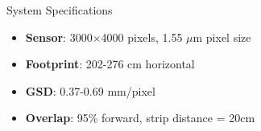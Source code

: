 \documentclass[aspectratio=43]{beamer}
\begin{document}
\begin{frame}
\begin{columns}
\begin{column}{0.5\textwidth}
            \begin{exampleblock}{System Specifications}
                \scriptsize
                \begin{itemize}
                    \item \textbf{Sensor}: 3000\ensuremath{\times}4000 pixels, 1.55 \ensuremath{\mu}m pixel size
                    \item \textbf{Footprint}: 202-276 cm horizontal
                    \item \textbf{GSD}: 0.37-0.69 mm/pixel
                    \item \textbf{Overlap}: 95\% forward, strip distance = 20cm
                \end{itemize}
            \end{exampleblock}
        \end{column}
    \end{columns}
\end{frame}
\end{document}
